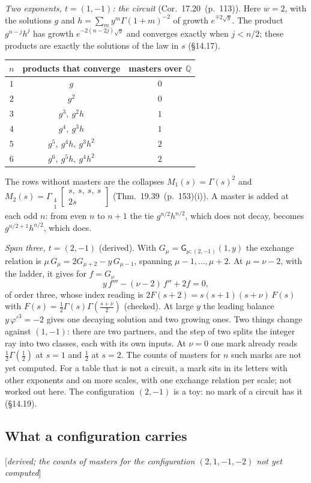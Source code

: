 \documentclass[11pt]{article}
\newcommand{\sG}{\mathsf G}
\newcommand{\Gst}[4]{\Gamma_{\substack{#1\\#2}}\!\begin{bmatrix}#3\\#4\end{bmatrix}}
\newcommand{\status}[1]{\hfill{\small[\textit{#1}]}}
\newcommand{\hb}[2]{#1~(p.~#2)}   %
\theoremstyle{plain}
\theoremstyle{remark}
\begin{document}
\emph{Two exponents, $t=(1,-1)$: the circuit} (Cor.~\hb{17.20}{113}). Here $w=2$, with the solutions $g$ and $h=\sum_my^m\Gamma(1+m)^{-2}$ of growth $e^{\mp2\sqrt y}$. The product $g^{n-j}h^j$ has growth $e^{-2(n-2j)\sqrt y}$ and converges exactly when $j<n/2$; these products are exactly the solutions of the law in $s$ (\S14.17).
\begin{center}
\begin{tabular}{ccc}
$n$ & products that converge & masters over $\mathbb Q$\\\hline
$1$ & $g$ & $0$\\
$2$ & $g^2$ & $0$\\
$3$ & $g^3,\ g^2h$ & $1$\\
$4$ & $g^4,\ g^3h$ & $1$\\
$5$ & $g^5,\ g^4h,\ g^3h^2$ & $2$\\
$6$ & $g^6,\ g^5h,\ g^4h^2$ & $2$
\end{tabular}
\end{center}
The rows without masters are the collapses $M_1(s)=\Gamma(s)^2$ and $M_2(s)=\Gst41{s,\ s,\ s,\ s}{2s}$ (Thm.~\hb{19.39}{153}(i)). A master is added at each odd $n$: from even $n$ to $n+1$ the tie $g^{n/2}h^{n/2}$, which does not decay, becomes $g^{n/2+1}h^{n/2}$, which does.

\emph{Span three, $t=(2,-1)$} (derived). With $G_\mu=\sG_{\mu;(2,-1)}(1,y)$ the exchange relation is $\mu\,G_\mu=2G_{\mu+2}-y\,G_{\mu-1}$, spanning $\mu-1,\dots,\mu+2$. At $\mu=\nu-2$, with the ladder, it gives for $f=G_\nu$
\[
y\,f'''-(\nu-2)\,f''+2f=0,
\]
of order three, whose index reading is $2F(s+2)=s(s+1)(s+\nu)\,F(s)$ with $F(s)=\frac12\Gamma(s)\Gamma(\frac{s+\nu}2)$ (checked). At large $y$ the leading balance $y\,\varphi'^3=-2$ gives one decaying solution and two growing ones. Two things change against $(1,-1)$: there are two partners, and the step of two splits the integer ray into two classes, each with its own inputs. At $\nu=0$ one mark already reads $\frac12\Gamma(\frac12)$ at $s=1$ and $\frac12$ at $s=2$. The counts of masters for $n$ such marks are not yet computed. For a table that is not a circuit, a mark sits in its letters with other exponents and on more scales, with one exchange relation per scale; not worked out here. The configuration $(2,-1)$ is a toy: no mark of a circuit has it (\S14.19).

\subsection{What a configuration carries}\status{derived; the counts of masters for the configuration $(2,1,-1,-2)$ not yet computed}
\end{document}

